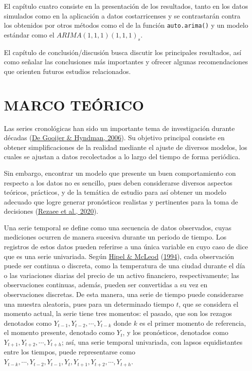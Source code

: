 \documentclass[
]{article}
\begin{document}
El capítulo cuatro consiste en la presentación de los resultados, tanto
en los datos simulados como en la aplicación a datos costarricenses y se
contrastarán contra los obtenidos por otros métodos como el de la
función \texttt{auto.arima()} y un modelo estándar como el
\(ARIMA(1,1,1)(1,1,1)_s\).

El capítulo de conclusión/discusión busca discutir los principales
resultados, así como señalar las conclusiones más importantes y ofrecer
algunas recomendaciones que orienten futuros estudios relacionados.

\newpage

\section{MARCO TEÓRICO}

Las series cronológicas han sido un importante tema de investigación
durante décadas (\protect\hyperlink{ref-tsa_decades}{De Gooijer \&
Hyndman, 2006}). Su objetivo principal consiste en obtener
simplificaciones de la realidad mediante el ajuste de diversos modelos,
los cuales se ajustan a datos recolectados a lo largo del tiempo de
forma periódica.

Sin embargo, encontrar un modelo que presente un buen comportamiento con
respecto a los datos no es sencillo, pues deben considerarse diversos
aspectos teóricos, prácticos, y de la temática de estudio para así
obtener un modelo adecuado que logre generar pronósticos realistas y
pertinentes para la toma de decisiones
(\protect\hyperlink{ref-tsa_decision_making}{Rezaee et al., 2020}).

Una serie temporal se define como una secuencia de datos observados,
cuyas mediciones ocurren de manera sucesiva durante un periodo de
tiempo. Los registros de estos datos pueden referirse a una única
variable en cuyo caso de dice que es una serie univariada. Según
\protect\hyperlink{ref-Hipel}{Hipel \& McLeod}
(\protect\hyperlink{ref-Hipel}{1994}), cada observación puede ser
continua o discreta, como la temperatura de una ciudad durante el día o
las variaciones diarias del precio de un activo financiero,
respectivamente; las observaciones continuas, además, pueden ser
convertidas a su vez en observaciones discretas. De esta manera, una
serie de tiempo puede considerarse una muestra aleatoria, pues para un
determinado tiempo \(t\), que se considera el momento actual, la serie
tiene tres momentos: el pasado, que son los rezagos denotados como
\(Y_{t-1}, Y_{t-2}, \cdots, Y_{t-k}\) donde \(k\) es el primer momento
de referencia, el momento presente, denotado como \(Y_t\), y los
pronósticos, denotados como \(Y_{t+1}, Y_{t+2}, \cdots, Y_{t+h}\); así,
una serie temporal univariada, con lapsos equidistantes entre los
tiempos, puede representarse como
\(Y_{t-k}, \cdots, Y_{t-2}, Y_{t-1}, Y_t, Y_{t+1}, Y_{t+2}, \cdots, Y_{t+h}\).
\end{document}
